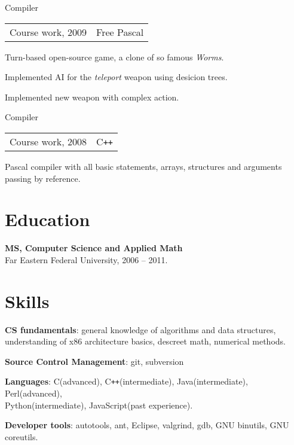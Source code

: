 \documentclass[a4paper]{article}
\begin{document}
\begin{multicols}{2}
		\begin{project}{Compiler}{\begin{tabular}{@{}l|l}Course work, 2009 & Free Pascal\\\end{tabular}}
			Turn-based open-source game, a clone of so famous \emph{Worms}.
			\begin{items}
				\item Implemented AI for the \emph{teleport} weapon using desicion trees.
				\item Implemented new weapon with complex action.
			\end{items}
		\end{project}
		\begin{project}{Compiler}{\begin{tabular}{@{}l|l}Course work, 2008 & C\texttt{++}\\\end{tabular}}
			Pascal compiler with all basic statements, arrays, structures and arguments passing by reference.
		\end{project}
	\end{multicols}

	\section{Education}
	\begin{items}
		\item \textbf{MS, Computer Science and Applied Math}\\
		Far Eastern Federal University, 2006 -- 2011.
	\end{items}

	\section{Skills}
	\begin{multicols}{2}
		\raggedcolumns
		\begin{items}
			\item \textbf{CS fundamentals}: general knowledge of algorithms and data structures, understanding of x86 architecture basics, descreet math, numerical methods.
			\item \textbf{Source Control Management}: git, subversion
			\columnbreak
			\item \textbf{Languages}: C(advanced), C\texttt{++}(intermediate), Java(intermediate), Perl(advanced),\\Python(intermediate), JavaScript(past experience).
			\item \textbf{Developer tools}: autotools, ant, Eclipse, valgrind, gdb, GNU binutils, GNU coreutils.
		\end{items}
	\end{multicols}
\end{document}

